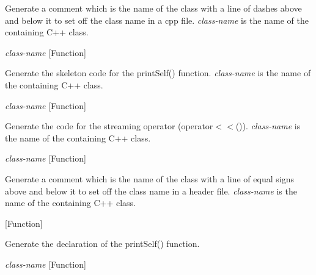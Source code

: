 \begin{doc-string}
Generate a comment which is the name of the class with a line of dashes
above and below it to set off the class name in a cpp file.
\emph{class-name} is the name of the containing C++ class.
\end{doc-string}

\vspace{1em}
\noindent
{}
\usebox{\funcname}\emph{class-name}
 \hfill [Function]

\begin{doc-string}
Generate the skeleton code for the printSelf() function.
\emph{class-name} is the name of the containing C++ class.
\end{doc-string}

\vspace{1em}
\noindent
{}
\usebox{\funcname}\emph{class-name}
 \hfill [Function]

\begin{doc-string}
Generate the code for the streaming operator (operator$<$$<$()).  \emph{class-name} is the
name of the containing C++ class.
\end{doc-string}

\vspace{1em}
\noindent
{}
\usebox{\funcname}\emph{class-name}
 \hfill [Function]

\begin{doc-string}
Generate a comment which is the name of the class with a line of equal
signs above and below it to set off the class name in a header file.
\emph{class-name} is the name of the containing C++ class.
\end{doc-string}

\vspace{1em}
\noindent
{}
\usebox{\funcname}
 \hfill [Function]

\begin{doc-string}
Generate the declaration of the printSelf() function.
\end{doc-string}

\vspace{1em}
\noindent
{}
\usebox{\funcname}\emph{class-name}
 \hfill [Function]

